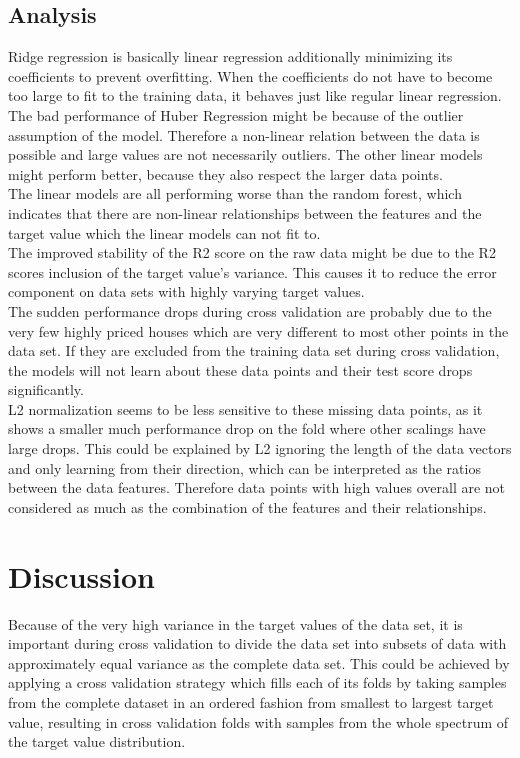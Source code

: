 \documentclass[a4paper,12pt]{article}
\newcommand{\initials}[1]{\marginpar{\quad\texttt{#1}}}
\begin{document}
\subsection{Analysis}
\initials{LB & MF}
Ridge regression is basically linear regression additionally minimizing its coefficients to prevent overfitting. When the coefficients do not have to become too large to fit to the training data, it behaves just like regular linear regression.\\
The bad performance of Huber Regression might be because of the outlier assumption of the model. Therefore a non-linear relation between the data is possible and large values are not necessarily outliers. The other linear models might perform better, because they also respect the larger data points.\\
The linear models are all performing worse than the random forest, which indicates that there are non-linear relationships between the features and the target value which the linear models can not fit to.\\
The improved stability of the R2 score on the raw data might be due to the R2 scores inclusion of the target value's variance. This causes it to reduce the error component on data sets with highly varying target values.\\
The sudden performance drops during cross validation are probably due to the very few highly priced houses which are very different to most other points in the data set. If they are excluded from the training data set during cross validation, the models will not learn about these data points and their test score drops significantly.\\
L2 normalization seems to be less sensitive to these missing data points, as it shows a smaller much performance drop on the fold where other scalings have large drops. This could be explained by L2 ignoring the length of the data vectors and only learning from their direction, which can be interpreted as the ratios between the data features. Therefore data points with high values overall are not considered as much as the combination of the features and their relationships.

\section{Discussion}
\initials{LB & MF}
Because of the very high variance in the target values of the data set, it is important during cross validation to divide the data set into subsets of data with approximately equal variance as the complete data set. This could be achieved by applying a cross validation strategy which fills each of its folds by taking samples from the complete dataset in an ordered fashion from smallest to largest target value, resulting in cross validation folds with samples from the whole spectrum of the target value distribution.
\end{document}
